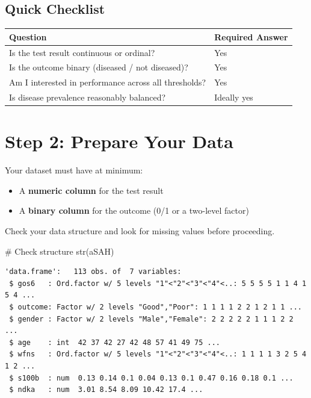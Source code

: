 \documentclass[
  letterpaper,
  DIV=11,
  numbers=noendperiod]{scrreprt}
\newenvironment{Shaded}{\begin{snugshade}}{\end{snugshade}}
\newcommand{\CommentTok}[1]{\textcolor[rgb]{0.37,0.37,0.37}{#1}}
\newcommand{\FunctionTok}[1]{\textcolor[rgb]{0.28,0.35,0.67}{#1}}
\newcommand{\NormalTok}[1]{\textcolor[rgb]{0.00,0.23,0.31}{#1}}
\providecommand{\tightlist}{%
  \setlength{\itemsep}{0pt}\setlength{\parskip}{0pt}}\usepackage{longtable,booktabs,array}
\begin{document}
\subsection{Quick Checklist}\label{quick-checklist}

\begin{longtable}[]{@{}ll@{}}
\toprule\noalign{}
Question & Required Answer \\
\midrule\noalign{}
\endhead
\bottomrule\noalign{}
\endlastfoot
Is the test result continuous or ordinal? & Yes \\
Is the outcome binary (diseased / not diseased)? & Yes \\
Am I interested in performance across all thresholds? & Yes \\
Is disease prevalence reasonably balanced? & Ideally yes \\
\end{longtable}

\section{Step 2: Prepare Your Data}\label{step-2-prepare-your-data}

Your dataset must have at minimum:

\begin{itemize}
\tightlist
\item
  A \textbf{numeric column} for the test result
\item
  A \textbf{binary column} for the outcome (0/1 or a two-level factor)
\end{itemize}

Check your data structure and look for missing values before proceeding.

\begin{Shaded}
\begin{Highlighting}[]
\CommentTok{\# Check structure}
\FunctionTok{str}\NormalTok{(aSAH)}
\end{Highlighting}
\end{Shaded}

\begin{verbatim}
'data.frame':   113 obs. of  7 variables:
 $ gos6   : Ord.factor w/ 5 levels "1"<"2"<"3"<"4"<..: 5 5 5 5 1 1 4 1 5 4 ...
 $ outcome: Factor w/ 2 levels "Good","Poor": 1 1 1 1 2 2 1 2 1 1 ...
 $ gender : Factor w/ 2 levels "Male","Female": 2 2 2 2 2 1 1 1 2 2 ...
 $ age    : int  42 37 42 27 42 48 57 41 49 75 ...
 $ wfns   : Ord.factor w/ 5 levels "1"<"2"<"3"<"4"<..: 1 1 1 1 3 2 5 4 1 2 ...
 $ s100b  : num  0.13 0.14 0.1 0.04 0.13 0.1 0.47 0.16 0.18 0.1 ...
 $ ndka   : num  3.01 8.54 8.09 10.42 17.4 ...
\end{verbatim}
\end{document}
